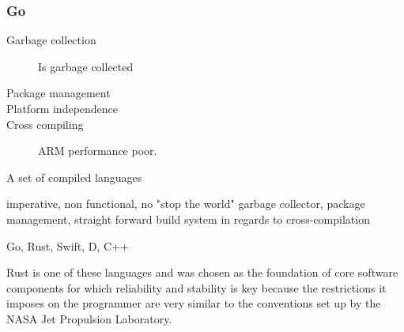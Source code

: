 \subsubsection{Go}
\begin{description} 
\item [Garbage collection] 
Is garbage collected
\item [Package management]
\item [Platform independence] 

\item [Cross compiling]
ARM performance poor.

\end{description}

A set of compiled languages 

imperative, non functional, no "stop the world" garbage collector, package management, straight forward build system in regards to cross-compilation

Go, Rust, Swift, D, C++







Rust \cite{rust} is one of these languages and was chosen as the foundation of core software components for which reliability and stability is key because the restrictions it imposes on the programmer are very similar to the conventions set up by the NASA Jet Propulsion Laboratory. 
